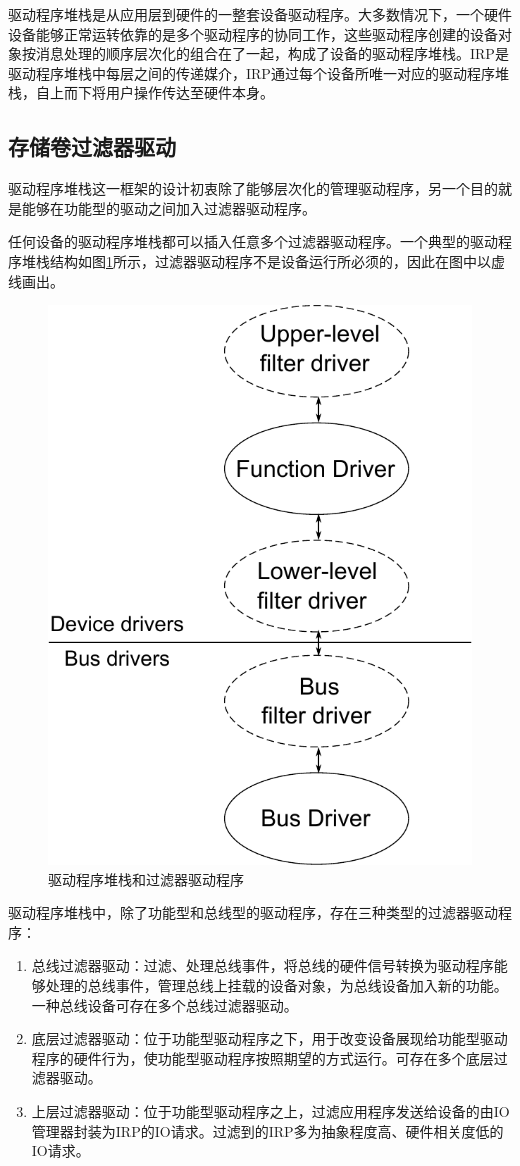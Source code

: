 驱动程序堆栈是从应用层到硬件的一整套设备驱动程序。大多数情况下，一个硬件设备能够正常运转依靠的是多个驱动程序的协同工作，这些驱动程序创建的设备对象按消息处理的顺序层次化的组合在了一起，构成了设备的驱动程序堆栈。IRP是驱动程序堆栈中每层之间的传递媒介，IRP通过每个设备所唯一对应的驱动程序堆栈，自上而下将用户操作传达至硬件本身。

\subsection{存储卷过滤器驱动}
驱动程序堆栈这一框架的设计初衷除了能够层次化的管理驱动程序，另一个目的就是能够在功能型的驱动之间加入过滤器驱动程序\cite{filterdrv2004}。

任何设备的驱动程序堆栈都可以插入任意多个过滤器驱动程序。一个典型的驱动程序堆栈结构如图\ref{fig:io-stack-filter}所示，过滤器驱动程序不是设备运行所必须的，因此在图中以虚线画出。
\begin{figure}[H]
\centering
\includegraphics[width=0.4\linewidth]{./graph/io-stack-filter}
\caption{驱动程序堆栈和过滤器驱动程序}
\label{fig:io-stack-filter}
\end{figure}

驱动程序堆栈中，除了功能型和总线型的驱动程序，存在三种类型的过滤器驱动程序：

\begin{enumerate}
\item
总线过滤器驱动：过滤、处理总线事件，将总线的硬件信号转换为驱动程序能够处理的总线事件，管理总线上挂载的设备对象，为总线设备加入新的功能。一种总线设备可存在多个总线过滤器驱动。
\item
底层过滤器驱动：位于功能型驱动程序之下，用于改变设备展现给功能型驱动程序的硬件行为，使功能型驱动程序按照期望的方式运行。可存在多个底层过滤器驱动。
\item
上层过滤器驱动：位于功能型驱动程序之上，过滤应用程序发送给设备的由IO管理器封装为IRP的IO请求。过滤到的IRP多为抽象程度高、硬件相关度低的IO请求。
\end{enumerate}

